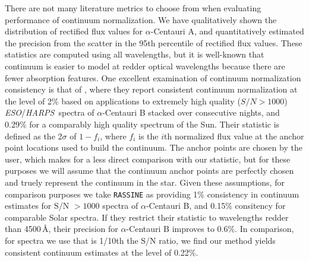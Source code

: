 \documentclass[modern]{aastex631}
\newcommand{\project}[1]{\textit{#1}}
\newcommand{\eso}{\project{ESO}}
\newcommand{\harps}{\project{HARPS}}
\newcommand{\todo}[1]{\textcolor{tab:red}{#1}}
\begin{document}
There are not many literature metrics to choose from when evaluating performance of continuum normalization. We have qualitatively shown the distribution of rectified flux values for $\alpha$-Centauri A, and quantitatively estimated the precision from the scatter in the 95th percentile of rectified flux values. These statistics are computed using all wavelengths, but it is well-known that continuum is easier to model at redder optical wavelengths because there are fewer absorption features. One excellent examination of continuum normalization consistency is that of \citet{RASSINE}, where they report consistent continuum normalization at the level of 2\% based on applications to extremely high quality ($S/N > 1000$) \eso/\harps\ spectra of $\alpha$-Centauri B stacked over consecutive nights, and 0.29\% for a comparably high quality spectrum of the Sun. Their statistic is defined as the 2$\sigma$ of $1-f_i$, where $f_i$ is the $i$th normalized flux value at the anchor point locations used to build the continuum. The anchor points are chosen by the user, which makes for a less direct comparison with our statistic, but for these purposes we will assume that the continuum anchor points are perfectly chosen and truely represent the continuum in the star. Given these assumptions, for comparison purposes we take \texttt{RASSINE} as providing 1\% consistency in continuum estimates for S/N $> 1000$ spectra of $\alpha$-Centauri B, and 0.15\% consitency for comparable Solar spectra. If they restrict their statistic to wavelengths redder than 4500\,\AA, their precision for $\alpha$-Centauri B improves to 0.6\%. In comparison, for spectra we use that is 1/10th the S/N ratio, we find our method yields consistent continuum estimates at the level of 0.22\%.\\


\end{document}
